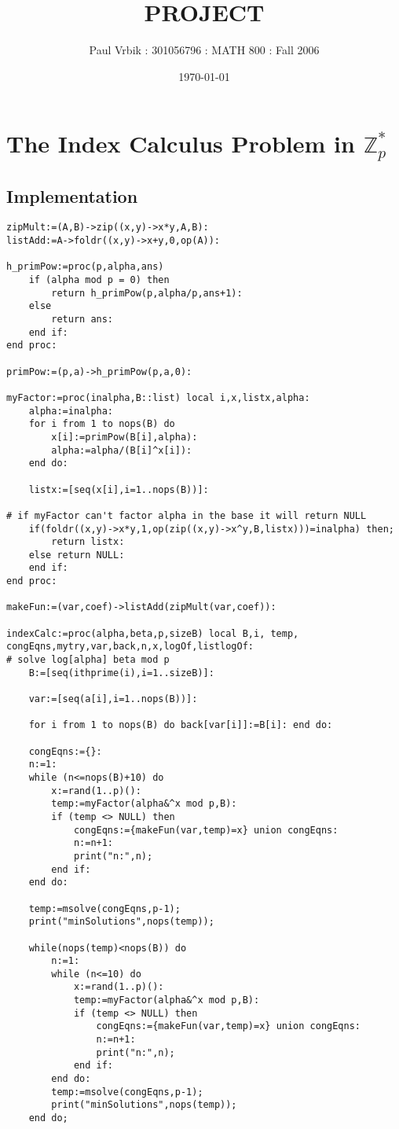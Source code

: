 \documentclass[article,oneside]{memoir}
\title{PROJECT}
\author{Paul Vrbik : 301056796 : MATH 800 : Fall 2006}
\date{\today}
\begin{document}
\section*{The Index Calculus Problem in $\mathbb{Z}_p^*$}

\subsection*{Implementation}

\begin{verbatim}
zipMult:=(A,B)->zip((x,y)->x*y,A,B):
listAdd:=A->foldr((x,y)->x+y,0,op(A)):

h_primPow:=proc(p,alpha,ans)
    if (alpha mod p = 0) then
        return h_primPow(p,alpha/p,ans+1):
    else
        return ans:
    end if:
end proc:

primPow:=(p,a)->h_primPow(p,a,0):

myFactor:=proc(inalpha,B::list) local i,x,listx,alpha:
    alpha:=inalpha:
    for i from 1 to nops(B) do
        x[i]:=primPow(B[i],alpha):
        alpha:=alpha/(B[i]^x[i]):
    end do:
    
    listx:=[seq(x[i],i=1..nops(B))]:	

# if myFactor can't factor alpha in the base it will return NULL	
    if(foldr((x,y)->x*y,1,op(zip((x,y)->x^y,B,listx)))=inalpha) then;
        return listx:
    else return NULL:
    end if:
end proc:

makeFun:=(var,coef)->listAdd(zipMult(var,coef)):

indexCalc:=proc(alpha,beta,p,sizeB) local B,i, temp, congEqns,mytry,var,back,n,x,logOf,listlogOf:
# solve log[alpha] beta mod p
    B:=[seq(ithprime(i),i=1..sizeB)]:

    var:=[seq(a[i],i=1..nops(B))]:

    for i from 1 to nops(B) do back[var[i]]:=B[i]: end do:

    congEqns:={}:
    n:=1:
    while (n<=nops(B)+10) do
        x:=rand(1..p)():
        temp:=myFactor(alpha&^x mod p,B):
        if (temp <> NULL) then
            congEqns:={makeFun(var,temp)=x} union congEqns:
            n:=n+1:
            print("n:",n);
        end if:
    end do:

    temp:=msolve(congEqns,p-1);
    print("minSolutions",nops(temp));
  
    while(nops(temp)<nops(B)) do
        n:=1:
        while (n<=10) do
            x:=rand(1..p)():
            temp:=myFactor(alpha&^x mod p,B):
            if (temp <> NULL) then
                congEqns:={makeFun(var,temp)=x} union congEqns:
                n:=n+1:
                print("n:",n);
            end if:
        end do:
        temp:=msolve(congEqns,p-1);        
        print("minSolutions",nops(temp));
    end do;


\end{verbatim}
\end{document}
